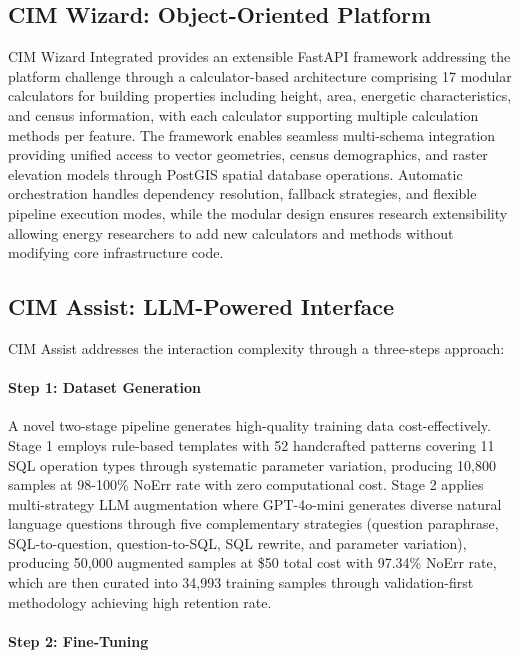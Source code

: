 \subsection{CIM Wizard: Object-Oriented Platform}

CIM Wizard Integrated provides an extensible FastAPI framework addressing the platform challenge through a calculator-based architecture comprising 17 modular calculators for building properties including height, area, energetic characteristics, and census information, with each calculator supporting multiple calculation methods per feature. The framework enables seamless multi-schema integration providing unified access to vector geometries, census demographics, and raster elevation models through PostGIS spatial database operations. Automatic orchestration handles dependency resolution, fallback strategies, and flexible pipeline execution modes, while the modular design ensures research extensibility allowing energy researchers to add new calculators and methods without modifying core infrastructure code.

\subsection{CIM Assist: LLM-Powered Interface}

CIM Assist addresses the interaction complexity through a three-steps approach:

\paragraph{Step 1: Dataset Generation}

A novel two-stage pipeline generates high-quality training data cost-effectively. Stage 1 employs rule-based templates with 52 handcrafted patterns covering 11 SQL operation types through systematic parameter variation, producing 10,800 samples at 98-100\% NoErr rate with zero computational cost. Stage 2 applies multi-strategy LLM augmentation where GPT-4o-mini generates diverse natural language questions through five complementary strategies (question paraphrase, SQL-to-question, question-to-SQL, SQL rewrite, and parameter variation), producing 50,000 augmented samples at \$50 total cost with 97.34\% NoErr rate, which are then curated into 34,993 training samples through validation-first methodology achieving high retention rate.

\paragraph{Step 2: Fine-Tuning}

